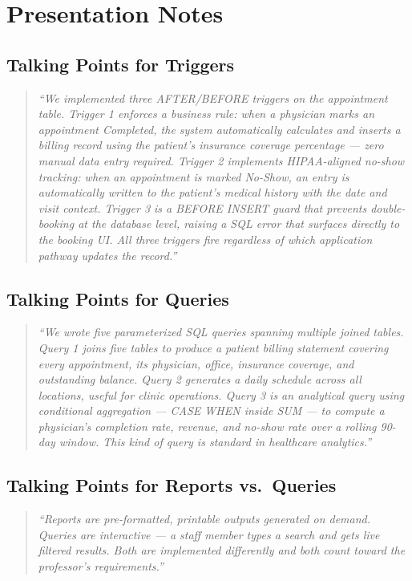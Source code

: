 \documentclass[12pt, letterpaper]{article}
\begin{document}
\section{Presentation Notes}

\subsection{Talking Points for Triggers}
\begin{quote}
\itshape
``We implemented three AFTER/BEFORE triggers on the appointment table. Trigger 1 enforces a business rule: when a physician marks an appointment Completed, the system automatically calculates and inserts a billing record using the patient's insurance coverage percentage — zero manual data entry required. Trigger 2 implements HIPAA-aligned no-show tracking: when an appointment is marked No-Show, an entry is automatically written to the patient's medical history with the date and visit context. Trigger 3 is a BEFORE INSERT guard that prevents double-booking at the database level, raising a SQL error that surfaces directly to the booking UI. All three triggers fire regardless of which application pathway updates the record.''
\end{quote}

\subsection{Talking Points for Queries}
\begin{quote}
\itshape
``We wrote five parameterized SQL queries spanning multiple joined tables. Query 1 joins five tables to produce a patient billing statement covering every appointment, its physician, office, insurance coverage, and outstanding balance. Query 2 generates a daily schedule across all locations, useful for clinic operations. Query 3 is an analytical query using conditional aggregation — CASE WHEN inside SUM — to compute a physician's completion rate, revenue, and no-show rate over a rolling 90-day window. This kind of query is standard in healthcare analytics.''
\end{quote}

\subsection{Talking Points for Reports vs.\ Queries}
\begin{quote}
\itshape
``Reports are pre-formatted, printable outputs generated on demand. Queries are interactive — a staff member types a search and gets live filtered results. Both are implemented differently and both count toward the professor's requirements.''
\end{quote}
\end{document}

